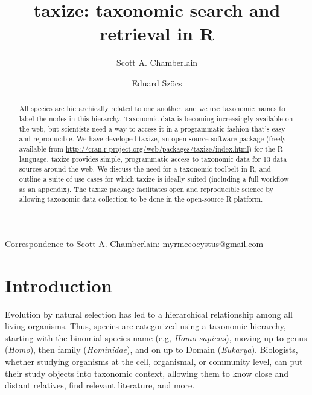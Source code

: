 \documentclass[10pt,a4paper,twocolumn]{article}
\begin{document}
\title{taxize: taxonomic search and retrieval in R}
\author[1]{Scott A. Chamberlain}
\author[2]{Eduard Sz\"{o}cs}

\maketitle
\thispagestyle{fancy}

Correspondence to Scott A. Chamberlain: myrmecocystus@gmail.com

\begin{abstract}

All species are hierarchically related to one another, and we use taxonomic names to label the nodes in this hierarchy. Taxonomic data is becoming increasingly available on the web, but scientists need a way to access it in a programmatic fashion that's easy and reproducible. We have developed taxize, an open-source software package (freely available from \url{http://cran.r-project.org/web/packages/taxize/index.html}) for the R language. taxize provides simple, programmatic access to taxonomic data for 13 data sources around the web. We discuss the need for a taxonomic toolbelt in R, and outline a suite of use cases for which taxize is ideally suited (including a full workflow as an appendix). The taxize package facilitates open and reproducible science by allowing taxonomic data collection to be done in the open-source R platform.

\end{abstract}
\clearpage

\section*{Introduction}

Evolution by natural selection has led to a hierarchical relationship among all living organisms.  Thus, species are categorized using a taxonomic hierarchy, starting with the binomial species name (e.g, \emph{Homo sapiens}), moving up to genus (\emph{Homo}), then family (\emph{Hominidae}), and on up to Domain (\emph{Eukarya}). Biologists, whether studying organisms at the cell, organismal, or community level, can put their study objects into taxonomic context, allowing them to know close and distant relatives, find relevant literature, and more. 
\end{document}
